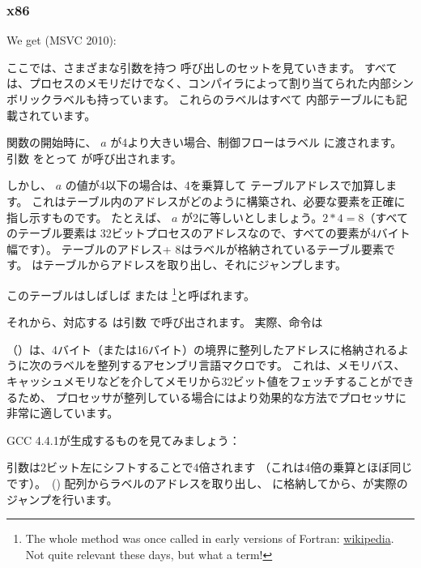 ﻿\subsubsection{x86}


We get (MSVC 2010):




ここでは、さまざまな引数を持つ \printf 呼び出しのセットを見ていきます。
すべては、プロセスのメモリだけでなく、コンパイラによって割り当てられた内部シンボリックラベルも持っています。
これらのラベルはすべて  内部テーブルにも記載されています。

関数の開始時に、 $a$ が4より大きい場合、制御フローはラベル に渡されます。
引数 をとって \printf が呼び出されます。

しかし、 $a$ の値が4以下の場合は、4を乗算して テーブルアドレスで加算します。 
これはテーブル内のアドレスがどのように構築され、必要な要素を正確に指し示すものです。 
たとえば、 $a$ が2に等しいとしましょう。$2*4 = 8$（すべてのテーブル要素は
32ビットプロセスのアドレスなので、すべての要素が4バイト幅です）。
テーブルのアドレス+ 8はラベルが格納されているテーブル要素です。
\JMP はテーブルからアドレスを取り出し、それにジャンプします。

このテーブルはしばしば または \footnote{The whole method was once called 
 in early versions of Fortran:
\href{http://go.yurichev.com/17122}{wikipedia}.
Not quite relevant these days, but what a term!}と呼ばれます。

それから、対応する \printf は引数 で呼び出されます。
実際、命令は 

（）は、4バイト（または16バイト）の境界に整列したアドレスに格納されるように次のラベルを整列するアセンブリ言語マクロです。
これは、メモリバス、キャッシュメモリなどを介してメモリから32ビット値をフェッチすることができるため、
プロセッサが整列している場合にはより効果的な方法でプロセッサに非常に適しています。



\label{switch_lot_GCC}

GCC 4.4.1が生成するものを見てみましょう：




引数は2ビット左にシフトすることで4倍されます
（これは4倍の乗算とほぼ同じです）。~()
配列からラベルのアドレスを取り出し、 \EAX に格納してから、が実際のジャンプを行います。

